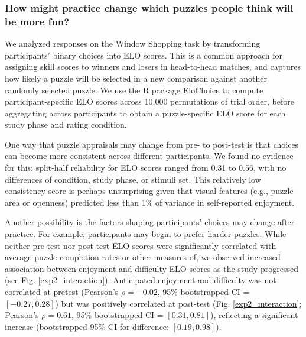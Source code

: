 \documentclass[10pt,letterpaper]{article}
\begin{document}
\subsubsection{How might practice change which puzzles people think will be more fun?}

We analyzed responses on the Window Shopping task by transforming participants' binary choices into ELO scores. This is a common approach for assigning skill scores to winners and losers in head-to-head matches, and captures how likely a puzzle will be selected in a new comparison against another randomly selected puzzle. %
We use the R package EloChoice \cite{Clark2018} to compute participant-specific ELO scores across 10,000 permutations of trial order, before aggregating across participants to obtain a puzzle-specific ELO score for each study phase and rating condition. 

One way that puzzle appraisals may change from pre- to post-test is that choices can become more consistent across different participants. We found no evidence for this: split-half reliability for ELO scores ranged from 0.31 to 0.56, with no differences of condition, study phase, or stimuli set. This relatively low consistency score is perhaps unsurprising given that visual features (e.g., puzzle area or openness) predicted less than 1\% of variance in self-reported enjoyment.

Another possibility is the factors shaping participants' choices may change after practice. For example, participants may begin to prefer harder puzzles. While neither pre-test nor post-test ELO scores were significantly correlated with average puzzle completion rates or other measures of, we observed increased association between enjoyment and difficulty ELO scores as the study progressed (see Fig. \ref{exp2_interaction}). Anticipated enjoyment and difficulty was not correlated at pretest (Pearson's $\rho=-0.02$, 95\% bootstrapped CI = $[-0.27, 0.28]$) but was positively correlated at post-test (Fig. \ref{exp2_interaction}; Pearson's $\rho = 0.61$, 95\% bootstrapped CI = $[0.31, 0.81]$), reflecting a significant increase (bootstrapped 95\% CI for difference: $[0.19, 0.98]$). 
\end{document}
